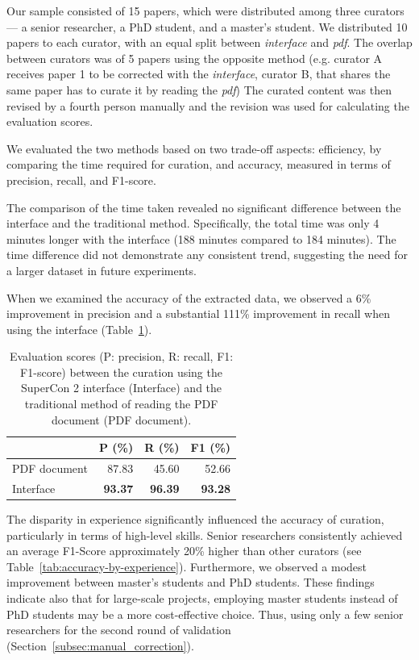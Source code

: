 \documentclass[a4paper]{article}
\begin{document}
Our sample consisted of 15 papers, which were distributed among three curators — a senior researcher, a PhD student, and a master's student. 
We distributed 10 papers to each curator, with an equal split between \textit{interface} and \textit{pdf}. The overlap between curators was of 5 papers using the opposite method (e.g. curator A receives paper 1 to be corrected with the \textit{interface}, curator B, that shares the same paper has to curate it by reading the \textit{pdf})
The curated content was then revised by a fourth person manually and the revision was used for calculating the evaluation scores. 

We evaluated the two methods based on two trade-off aspects: efficiency, by comparing the time required for curation, and accuracy, measured in terms of precision, recall, and F1-score.

The comparison of the time taken revealed no significant difference between the interface and the traditional method. Specifically, the total time was only 4 minutes longer with the interface (188 minutes compared to 184 minutes). The time difference did not demonstrate any consistent trend, suggesting the need for a larger dataset in future experiments.

When we examined the accuracy of the extracted data, we observed a 6\% improvement in precision and a substantial 111\% improvement in recall when using the interface (Table~\ref{tab:evaluation-interface-correction}). 

\begin{table}[ht]
\centering\small
\caption{Evaluation scores (P: precision, R: recall, F1: F1-score) between the curation using the SuperCon 2 interface (Interface) and the traditional method of reading the PDF document (PDF document). }
\begin{tabular}{lrrr}
\toprule
                    & \textbf{P (\%)}   & \textbf{R (\%)}   & \textbf{F1 (\%)}  \\
    \midrule
    PDF document    & 87.83             & 45.60             & 52.66             \\
    Interface       & \textbf{93.37}    & \textbf{96.39}    & \textbf{93.28}    \\
    \bottomrule
\end{tabular}
\label{tab:evaluation-interface-correction}
\end{table}

The disparity in experience significantly influenced the accuracy of curation, particularly in terms of high-level skills. Senior researchers consistently achieved an average F1-Score approximately 20\% higher than other curators (see Table~\ref{tab:accuracy-by-experience}). Furthermore, we observed a modest improvement between master's students and PhD students. These findings indicate also that for large-scale projects, employing master students instead of PhD students may be a more cost-effective choice. Thus, using only a few senior researchers for the second round of validation (Section~\ref{subsec:manual_correction}).
\end{document}
